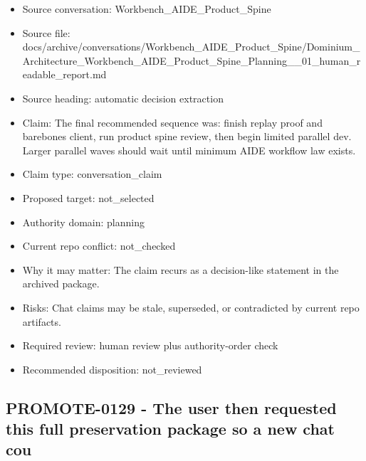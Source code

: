 \documentclass[11pt,a4paper]{report}
\begin{document}
\begin{itemize}
\item Source conversation: Workbench\_AIDE\_Product\_Spine
\item Source file: docs/archive/conversations/Workbench\_AIDE\_Product\_Spine/Dominium\_Architecture\_Workbench\_AIDE\_Product\_Spine\_Planning\_\_01\_human\_readable\_report.md
\item Source heading: automatic decision extraction
\item Claim: The final recommended sequence was: finish replay proof and barebones client, run product spine review, then begin limited parallel dev. Larger parallel waves should wait until minimum AIDE workflow law exists.
\item Claim type: conversation\_claim
\item Proposed target: not\_selected
\item Authority domain: planning
\item Current repo conflict: not\_checked
\item Why it may matter: The claim recurs as a decision-like statement in the archived package.
\item Risks: Chat claims may be stale, superseded, or contradicted by current repo artifacts.
\item Required review: human review plus authority-order check
\item Recommended disposition: not\_reviewed
\end{itemize}

\subsection{PROMOTE-0129 - The user then requested this full preservation package so a new chat cou}
\end{document}
